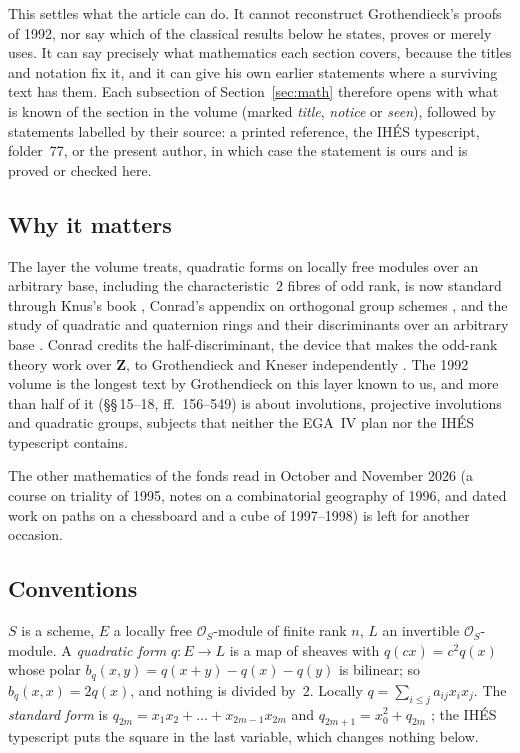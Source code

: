 \documentclass[11pt,a4paper]{amsart}
\newcommand{\cO}{\mathcal{O}}
\newcommand{\Z}{\mathbf{Z}}
\theoremstyle{plain}
\theoremstyle{definition}
\begin{document}
This settles what the article can do. It cannot reconstruct Grothendieck's proofs of 1992, nor say which of the classical results below he states, proves or merely uses. It can say precisely what mathematics each section covers, because the titles and notation fix it, and it can give his own earlier statements where a surviving text has them. Each subsection of Section~\ref{sec:math} therefore opens with what is known of the section in the volume (marked \emph{title}, \emph{notice} or \emph{seen}), followed by statements labelled by their source: a printed reference, the IHÉS typescript, folder~77, or the present author, in which case the statement is ours and is proved or checked here.

\subsection{Why it matters}
The layer the volume treats, quadratic forms on locally free modules over an arbitrary base, including the characteristic~$2$ fibres of odd rank, is now standard through Knus's book \cite{knus}, Conrad's appendix on orthogonal group schemes \cite{conrad}, and the study of quadratic and quaternion rings and their discriminants over an arbitrary base \cite{voight2011, voight2016, wood}. Conrad credits the half-discriminant, the device that makes the odd-rank theory work over $\Z$, to Grothendieck and Kneser independently \cite[\S\,C.1]{conrad}. The 1992 volume is the longest text by Grothendieck on this layer known to us, and more than half of it (\S\S\,15--18, ff.~156--549) is about involutions, projective involutions and quadratic groups, subjects that neither the EGA~IV plan nor the IHÉS typescript contains.

The other mathematics of the fonds read in October and November 2026 (a course on triality of 1995, notes on a combinatorial geography of 1996, and dated work on paths on a chessboard and a cube of 1997--1998) is left for another occasion.

\subsection*{Conventions}
$S$ is a scheme, $E$ a locally free $\cO_S$-module of finite rank $n$, $L$ an invertible $\cO_S$-module. A \emph{quadratic form} $q\colon E\to L$ is a map of sheaves with $q(cx)=c^2q(x)$ whose polar $b_q(x,y)=q(x+y)-q(x)-q(y)$ is bilinear; so $b_q(x,x)=2q(x)$, and nothing is divided by~$2$. Locally $q=\sum_{i\le j}a_{ij}x_ix_j$. The \emph{standard form} is $q_{2m}=x_1x_2+\dots+x_{2m-1}x_{2m}$ and $q_{2m+1}=x_0^2+q_{2m}$ \cite[Def.~C.1.2]{conrad}; the IHÉS typescript puts the square in the last variable, which changes nothing below.
\end{document}
